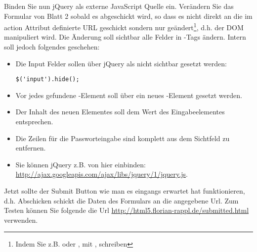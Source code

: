 %
\par Binden Sie nun jQuery als externe JavaScript Quelle ein. Verändern Sie das
Formular von Blatt 2 sobald es abgeschickt wird, so dass es nicht direkt an die
im action Attribut definierte URL geschickt sondern nur geändert\footnote{Indem
Sie z.B.  oder
, mit
, schreiben}, d.h. der DOM
manipuliert wird. Die Änderung soll sichtbar alle  Felder in
-Tags ändern. Intern soll jedoch folgendes geschehen:
%
\begin{itemize}
\item
Die Input Felder sollen über jQuery als nicht sichtbar gesetzt werden:
%
\begin{lstlisting}
$('input').hide();
\end{lstlisting}
%
\item 
Vor jedes gefundene -Element soll über  ein
neues -Element gesetzt werden.
\item 
Der Inhalt des neuen Elementes soll dem Wert des Eingabeelementes entsprechen.
\item 
Die Zeilen für die Passworteingabe sind komplett aus dem Sichtfeld zu
entfernen.
\item 
Sie können jQuery z.B. von hier einbinden:
\url{http://ajax.googleapis.com/ajax/libs/jquery/1/jquery.js}.
\end{itemize}
%
\par Jetzt sollte der Submit Button wie man es eingangs erwartet hat
funktionieren, d.h. Abschicken schickt die Daten des Formulars an die
angegebene Url. Zum Testen können Sie folgende die Url
\url{http://html5.florian-rappl.de/submitted.html} verwenden.